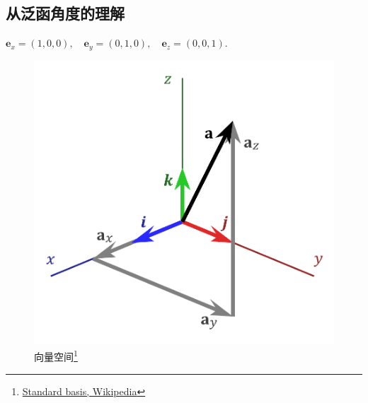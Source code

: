 \subsection{从泛函角度的理解}
\begin{frame}
    \begin{figure}
        \centering
        \resizebox{1.1\onepicwidth}{!}{}
    \end{figure}
\end{frame}


\begin{frame}
    ${\mathbf  {e}}_{x}=(1,0,0),\quad {\mathbf  {e}}_{y}=(0,1,0),\quad {\mathbf {e}}_{z}=(0,0,1)$.

    \begin{figure}[!tb]
        \includegraphics[width=0.8\onepicwidth]{figure/gbdt/3D_Vector}
        \caption{向量空间\footnote{
                 \href{https://en.wikipedia.org/wiki/Standard_basis}{Standard basis, Wikipedia}}}
    \end{figure}
\end{frame}

